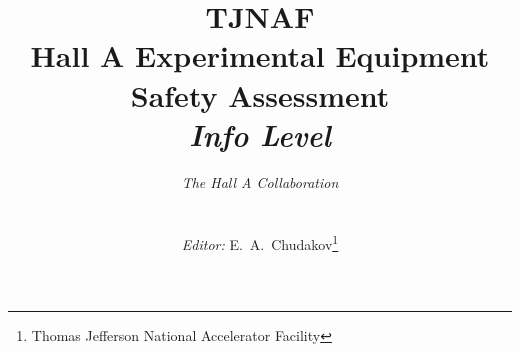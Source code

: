 \begin{titlepage}
\title{{\bf TJNAF \\ Hall A Experimental Equipment \\ 
     Safety Assessment \\[0.5cm]
    }{\normalsize {\sl Info Level \infolevel}}\\
}

\author{\centerline{{\it The Hall A Collaboration}}\\ 
    \centerline{\small {\it Editor:} E.~A.~Chudakov\thanks{Thomas Jefferson National Accelerator Facility}}
}
    
\setcounter{tocdepth}{3}
\end{titlepage} 
\maketitle 
 
